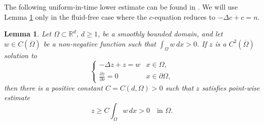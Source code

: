 \documentclass{amsart}
\newtheorem{lemma}[defn]{Lemma}
\numberwithin{equation}{section}
\newcommand{\R}{{ \mathbb{R}  }}
\begin{document}
The following uniform-in-time lower estimate can be found in \cite[Lem.~2.1]{Fujie_2014}. We will use Lemma \ref{ULE} only in the fluid-free case where the $c$-equation reduces to $-\Delta c+c=n$.
\begin{lemma}\label{ULE}
Let $\Omega\subset \R^{d}$, $d\ge1$, be a smoothly bounded domain, and let $w\in  C(\overline{\Omega})$ be a non-negative function such that $\int_{\Omega} w \,dx > 0$. If $z$ is a $ C^{2}(\overline{\Omega})$ solution to
\begin{equation}
\begin{cases}
-\Delta z + z = w & x\in\Omega, \\
\frac{\partial z}{\partial\nu} = 0 & x\in\partial\Omega,
\end{cases}
\end{equation}
then there is a positive constant $C=C(d,\Omega)>0$ such that $z$ satisfies point-wise estimate
\begin{equation}
z \ge C \int_{\Omega} w \,dx > 0 \quad \text{in } \Omega.
\end{equation}
\end{lemma}
\end{document}

